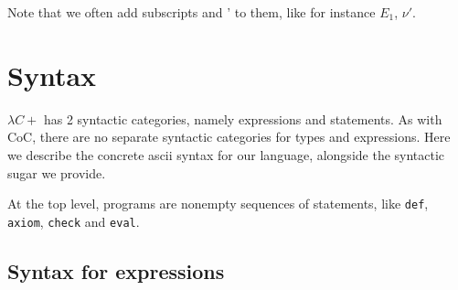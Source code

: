 \documentclass{article}
\begin{document}
Note that we often add subscripts and ' to them, like for instance
$E_1$, $\nu'$.

\section{Syntax}

$\lambda C+$ has 2 syntactic categories, namely expressions and statements.
As with CoC, there are no separate syntactic categories for types and
expressions.
Here we describe the concrete ascii syntax for our language, alongside
the syntactic sugar we provide.

At the top level, programs are nonempty sequences of statements,
like \texttt{def}, \texttt{axiom}, \texttt{check} and \texttt{eval}.


\subsection{Syntax for expressions}



\end{document}
